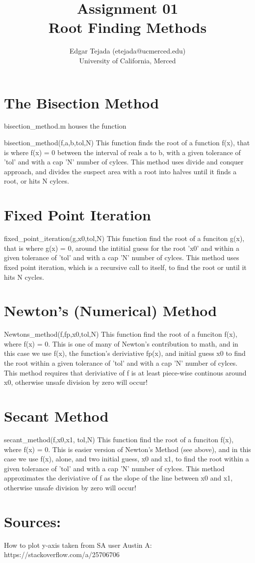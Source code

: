 \documentclass [12pt]{article}
\title{Assignment 01 \\\medskip Root Finding Methods}
\author{Edgar Tejada (etejada@ucmerced.edu)\\University of California, Merced}
\begin{document}
\maketitle

\newpage
\section{The Bisection Method}
bisection_method.m houses the function

\indent bisection_method(f,a,b,tol,N)
\indent \indent This function finds the root of a function f(x), that is where f(x) = 0 between the interval of reals a to b, with a given tolerance of 'tol' and with a cap 'N' number of cylces. This method uses divide and conquer approach, and divides the suspect area with a root into halves until it finds a root, or hits N cylces.

\newpage
\section{Fixed Point Iteration}

\indent fixed_point_iteration(g,x0,tol,N)
\indent \indent This function find the root of a funciton g(x), that is where g(x) = 0, around the intitial guess for the root 'x0' and within a given tolerance of 'tol' and with a cap 'N' number of cylces. This method uses fixed point iteration, which is a recursive call to itself, to find the root or until it hits N cycles.

\newpage
\section{Newton's (Numerical) Method}
\indent Newtons_method(f,fp,x0,tol,N)
\indent \indent This function find the root of a funciton f(x), where f(x) = 0. This is one of many of Newton's contribution to math, and in this case we use f(x), the function's deriviative fp(x), and initial guess x0 to find the root within a given tolerance of 'tol' and with a cap 'N' number of cylces. This method requires that deriviative of f is at least piece-wise continous around x0, otherwise unsafe division by zero will occur!

\newpage
\section{Secant Method}
\indent secant_method(f,x0,x1, tol,N)
\indent \indent This function find the root of a funciton f(x), where f(x) = 0. This is easier version of Newton's Method (see above), and in this case we use f(x), alone, and two initial guess, x0 and x1, to find the root within a given tolerance of 'tol' and with a cap 'N' number of cylces. This method approximates the deriviative of f as the slope of the line between x0 and x1, otherwise unsafe division by zero will occur!

\newpage
\section{Sources:}
How to plot y-axis taken from SA user Austin A:
\indent https://stackoverflow.com/a/25706706 


\nocite{*} 
\printbibliography
\end{document}
